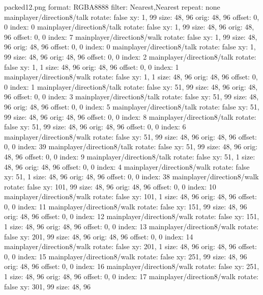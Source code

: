 packed12.png
format: RGBA8888
filter: Nearest,Nearest
repeat: none
mainplayer/direction8/talk
  rotate: false
  xy: 1, 99
  size: 48, 96
  orig: 48, 96
  offset: 0, 0
  index: 0
mainplayer/direction8/talk
  rotate: false
  xy: 1, 99
  size: 48, 96
  orig: 48, 96
  offset: 0, 0
  index: 7
mainplayer/direction8/walk
  rotate: false
  xy: 1, 99
  size: 48, 96
  orig: 48, 96
  offset: 0, 0
  index: 0
mainplayer/direction8/talk
  rotate: false
  xy: 1, 99
  size: 48, 96
  orig: 48, 96
  offset: 0, 0
  index: 2
mainplayer/direction8/talk
  rotate: false
  xy: 1, 1
  size: 48, 96
  orig: 48, 96
  offset: 0, 0
  index: 1
mainplayer/direction8/walk
  rotate: false
  xy: 1, 1
  size: 48, 96
  orig: 48, 96
  offset: 0, 0
  index: 1
mainplayer/direction8/talk
  rotate: false
  xy: 51, 99
  size: 48, 96
  orig: 48, 96
  offset: 0, 0
  index: 3
mainplayer/direction8/talk
  rotate: false
  xy: 51, 99
  size: 48, 96
  orig: 48, 96
  offset: 0, 0
  index: 5
mainplayer/direction8/talk
  rotate: false
  xy: 51, 99
  size: 48, 96
  orig: 48, 96
  offset: 0, 0
  index: 8
mainplayer/direction8/talk
  rotate: false
  xy: 51, 99
  size: 48, 96
  orig: 48, 96
  offset: 0, 0
  index: 6
mainplayer/direction8/walk
  rotate: false
  xy: 51, 99
  size: 48, 96
  orig: 48, 96
  offset: 0, 0
  index: 39
mainplayer/direction8/talk
  rotate: false
  xy: 51, 99
  size: 48, 96
  orig: 48, 96
  offset: 0, 0
  index: 9
mainplayer/direction8/talk
  rotate: false
  xy: 51, 1
  size: 48, 96
  orig: 48, 96
  offset: 0, 0
  index: 4
mainplayer/direction8/walk
  rotate: false
  xy: 51, 1
  size: 48, 96
  orig: 48, 96
  offset: 0, 0
  index: 38
mainplayer/direction8/walk
  rotate: false
  xy: 101, 99
  size: 48, 96
  orig: 48, 96
  offset: 0, 0
  index: 10
mainplayer/direction8/walk
  rotate: false
  xy: 101, 1
  size: 48, 96
  orig: 48, 96
  offset: 0, 0
  index: 11
mainplayer/direction8/walk
  rotate: false
  xy: 151, 99
  size: 48, 96
  orig: 48, 96
  offset: 0, 0
  index: 12
mainplayer/direction8/walk
  rotate: false
  xy: 151, 1
  size: 48, 96
  orig: 48, 96
  offset: 0, 0
  index: 13
mainplayer/direction8/walk
  rotate: false
  xy: 201, 99
  size: 48, 96
  orig: 48, 96
  offset: 0, 0
  index: 14
mainplayer/direction8/walk
  rotate: false
  xy: 201, 1
  size: 48, 96
  orig: 48, 96
  offset: 0, 0
  index: 15
mainplayer/direction8/walk
  rotate: false
  xy: 251, 99
  size: 48, 96
  orig: 48, 96
  offset: 0, 0
  index: 16
mainplayer/direction8/walk
  rotate: false
  xy: 251, 1
  size: 48, 96
  orig: 48, 96
  offset: 0, 0
  index: 17
mainplayer/direction8/walk
  rotate: false
  xy: 301, 99
  size: 48, 96
